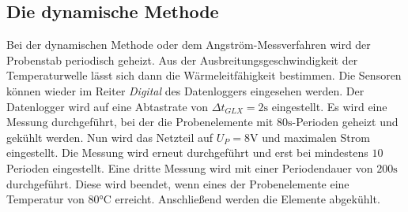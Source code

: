 \subsection{Die dynamische Methode}
\label{sec:dynamisch}
Bei der dynamischen Methode oder dem Angström-Messverfahren wird der Probenstab
periodisch geheizt. Aus der Ausbreitungsgeschwindigkeit der Temperaturwelle lässt sich
dann die Wärmeleitfähigkeit bestimmen. Die Sensoren können wieder im Reiter \textit{Digital}
des Datenloggers eingesehen werden. Der Datenlogger wird auf eine Abtastrate von
$\Delta t_{GLX} = 2 \si{\second}$ eingestellt. Es wird eine Messung durchgeführt,
bei der die Probenelemente mit $80 \si{\second}$-Perioden geheizt und gekühlt werden.
Nun wird das Netzteil auf $U_P = 8 \si{\volt}$ und maximalen Strom eingestellt.
Die Messung wird erneut durchgeführt und erst bei mindestens $10$ Perioden eingestellt.
Eine dritte Messung wird mit einer Periodendauer von $200 \si{\second}$ durchgeführt.
Diese wird beendet, wenn eines der Probenelemente eine Temperatur von $80 \si{\celsius}$
erreicht. Anschließend werden die Elemente abgekühlt.
